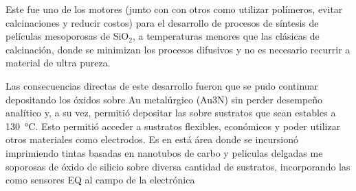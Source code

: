 	Este fue uno de los motores (junto con con otros como utilizar polímeros, evitar calcinaciones y reducir costos) para el desarrollo de procesos de síntesis de películas mesoporosas de SiO$_2$, a temperaturas menores que las clásicas de calcinación, donde se minimizan los procesos difusivos y no es necesario recurrir a material de ultra pureza.

	Las consecuencias directas de este desarrollo fueron que se pudo continuar depositando los óxidos sobre Au metalúrgico (Au3N) sin perder desempeño analítico y, a su vez, permitió depositar las \pdm\space sobre sustratos que sean estables a \SI{130}{\celsius}. Esto permitió acceder a sustratos flexibles, económicos y poder utilizar otros materiales como electrodos. Es en está área donde se incursionó imprimiendo tintas basadas en nanotubos de carbo y peliculas delgadas me soporosas de óxido de silicio sobre diversa cantidad de sustratos, incorporando las \pdm\space como sensores EQ al campo de la electrónica

	